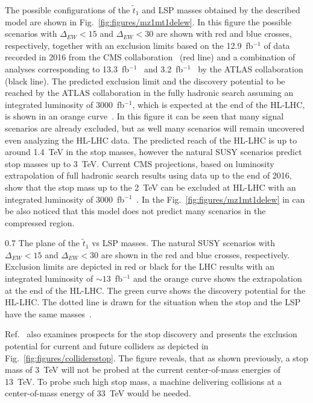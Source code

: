 The possible configurations of the $\tilde{t}_{1}$ and LSP masses obtained by the described model are shown in Fig.~\ref{fig:figures/mz1mt1delew}. In this figure the possible scenarios with $\Delta_{EW} <15$ and $\Delta_{EW} <30$ are shown with red and blue crosses, respectively, together with an exclusion limits based on the 12.9~fb$^{-1}$ of data recorded in  2016 from the CMS collaboration~\cite{CMS:2016hxa} (red line) and a combination of analyses corresponding to 13.3~fb$^{-1}$~\cite{ATLAS:2016jaa, ATLAS:2016ljb, ATLAS:2016xcm} and  3.2~fb$^{-1}$~\cite{Aaboud:2016tnv}  by the ATLAS collaboration (black line). The predicted exclusion limit and the discovery potential to be reached by the ATLAS collaboration in the fully hadronic search assuming an integrated luminosity of $3000$~fb$^{-1}$, which is expected at the end of the  HL-LHC, is shown in an orange curve~\cite{ATL-PHYS-PUB-2013-011}. In this figure it can be seen that many signal scenarios are already excluded, but as well many scenarios will remain uncovered even analyzing the HL-LHC data. The predicted reach of the HL-LHC is up to around 1.4~TeV in the stop masses, however the natural SUSY scenarios predict stop masses up to 3~TeV. Current CMS projections, based on luminosity extrapolation of full hadronic search results using data up to the end of 2016, show that the stop mass up to the 2~TeV can be excluded at HL-LHC with an integrated luminosity of 3000~fb$^{-1}$~\cite{website:moriond}. In the Fig.~\ref{fig:figures/mz1mt1delew} in can be also noticed that this model does not predict many scenarios in the compressed region.  

                 {0.7}       %
                 { The plane of the $\tilde{t}_{1}$ vs LSP masses. The natural SUSY scenarios with $\Delta_{EW} <15$ and $\Delta_{EW} <30$ are shown in the red and blue crosses, respectively. Exclusion limits are depicted in red or black for the LHC results with an integrated luminosity of $\sim 13$~fb$^{-1}$ and the orange curve shows the extrapolation at the end of the HL-LHC. The green curve shows the discovery potential for the HL-LHC. The dotted line is drawn for the situation when the stop and the LSP have the same masses~\cite{Baer:2016bwh}.   }

Ref.~\cite{Baer:2016bwh} also examines prospects for the stop discovery and presents the exclusion potential for current and future colliders as depicted in Fig.~\ref{fig:figures/collidersstop}. The figure reveals, that as shown previously, a stop mass of 3~TeV will not be probed at the current center-of-mass energies of 13~TeV. To probe such high stop mass, a machine delivering collisions at a center-of-mass energy of 33~TeV would be needed. 

